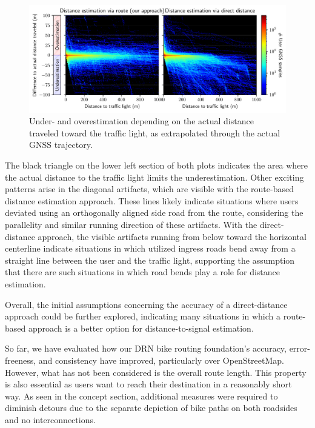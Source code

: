 \begin{figure}[t]
\centering 
\includegraphics[width=\linewidth]{images/routing-distance-scatter.pdf}
\caption{Under- and overestimation depending on the actual distance traveled toward the traffic light, as extrapolated through the actual GNSS trajectory.}
\label{fig:routing-distance-scatter}
\end{figure}

The black triangle on the lower left section of both plots indicates the area where the actual distance to the traffic light limits the underestimation. Other exciting patterns arise in the diagonal artifacts, which are visible with the route-based distance estimation approach. These lines likely indicate situations where users deviated using an orthogonally aligned side road from the route, considering the parallelity and similar running direction of these artifacts. With the direct-distance approach, the visible artifacts running from below toward the horizontal centerline indicate situations in which utilized ingress roads bend away from a straight line between the user and the traffic light, supporting the assumption that there are such situations in which road bends play a role for distance estimation.

Overall, the initial assumptions concerning the accuracy of a direct-distance approach could be further explored, indicating many situations in which a route-based approach is a better option for distance-to-signal estimation.

So far, we have evaluated how our DRN bike routing foundation's accuracy, error-freeness, and consistency have improved, particularly over OpenStreetMap. However, what has not been considered is the overall route length. This property is also essential as users want to reach their destination in a reasonably short way. As seen in the concept section, additional measures were required to diminish detours due to the separate depiction of bike paths on both roadsides and no interconnections. 

